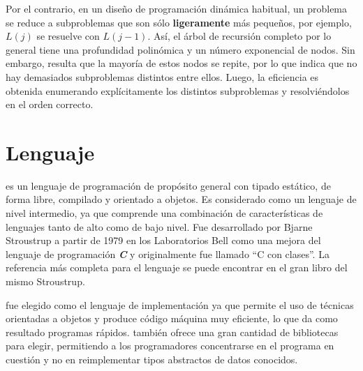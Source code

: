 Por el contrario, en un diseño de programación dinámica habitual, un problema se reduce a subproblemas que son sólo \textbf{ligeramente} más
pequeños, por ejemplo, $L(j)$ se resuelve con $L(j-1)$. Así, el árbol de recursión completo por lo general tiene una profundidad polinómica
y un número exponencial de nodos. Sin embargo, resulta que la mayoría de estos nodos se repite, por lo que indica que no hay demasiados
subproblemas distintos entre ellos. Luego, la eficiencia es obtenida enumerando explícitamente los distintos subproblemas y resolviéndolos
en el orden correcto\cite{algorithms06}.

\section{Lenguaje \cpp}

\cpp{} es un lenguaje de programación de propósito general con tipado estático, de forma libre, compilado y orientado a objetos. Es
considerado como un lenguaje de nivel intermedio, ya que comprende una combinación de características de lenguajes tanto de alto como de
bajo nivel. Fue desarrollado por Bjarne Stroustrup a partir de 1979 en los Laboratorios Bell como una mejora del lenguaje de programación
\textbf{\textit{C}} y originalmente fue llamado ``C con clases''. La referencia más completa para el lenguaje se puede encontrar en el gran
libro del mismo Stroustrup\cite{cplusplus}.

\cpp{} fue elegido como el lenguaje de implementación ya que permite el uso de técnicas orientadas a objetos y produce código máquina muy
eficiente, lo que da como resultado programas rápidos. \cpp{} también ofrece una gran cantidad de bibliotecas para elegir, permitiendo a
los programadores concentrarse en el programa en cuestión y no en reimplementar tipos abstractos de datos conocidos.
